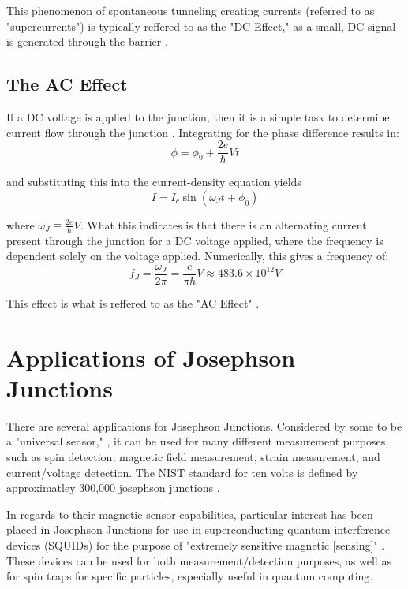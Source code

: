 \documentclass[letterpaper,english,reprint, aps]{revtex4}
\begin{document}
This phenomenon of spontaneous tunneling creating currents (referred to as "supercurrents") is typically reffered to as the "DC Effect," as a small, DC signal is generated through the barrier \citep{josephson,josephson_ieee,AC_detect,ac_dc_jj}.

\subsection{The AC Effect}
If a DC voltage is applied to the junction, then it is a simple task to determine current flow through the junction \citep{vanduzer}. Integrating for the phase difference results in:
\begin{equation}
    \phi = \phi_0 + \frac{2e}{\hbar}Vt
\end{equation}

and substituting this into the current-density equation yields
\begin{equation}
    I = I_c\sin(\omega_Jt+\phi_0)
\end{equation}

where $\omega_J \equiv \frac{2e}{\hbar}V$. What this indicates is that there is an alternating current present through the junction for a DC voltage applied, where the frequency is dependent solely on the voltage applied. Numerically, this gives a frequency of:
\begin{equation}
    f_J = \frac{\omega_J}{2\pi} = \frac{e}{\pi\hbar}V \approx 483.6\times10^{12}V
\end{equation}

This effect is what is reffered to as the "AC Effect" \citep{josephson, AC_He_jj, AC_detect, vanduzer, ac_dc_jj}. 
\section{Applications of Josephson Junctions}
There are several applications for Josephson Junctions. Considered by some to be a "universal sensor," \citep{josephson_ieee}, it can be used for many different measurement purposes, such as spin detection, magnetic field measurement, strain measurement, and current/voltage detection. The NIST standard for ten volts is defined by approximatley 300,000 josephson junctions \citep{nist,large_jj}.

In regards to their magnetic sensor capabilities, particular interest has been placed in Josephson Junctions for use in superconducting quantum interference devices (SQUIDs) for the purpose of "extremely sensitive magnetic [sensing]" \citep{jj_squid}. These devices can be used for both measurement/detection purposes, as well as for spin traps for specific particles, especially useful in quantum computing.
\end{document}
